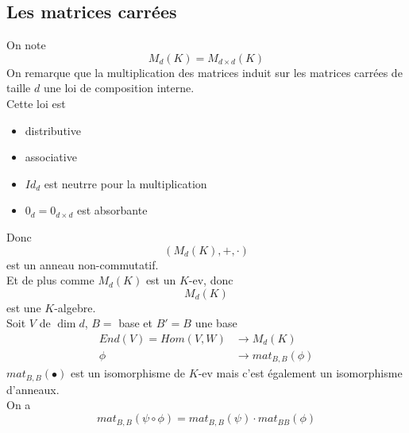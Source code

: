 \documentclass[../main.tex]{subfiles}
\begin{document}
\subsection{Les matrices carrées}
On note
\[ 
	M_{d} ( K) = M_{d\times d} ( K) 
\]
On remarque que la multiplication des matrices induit sur les matrices carrées de taille $d$ une loi de composition interne.\\
Cette loi est
\begin{itemize}
\item distributive
\item associative
\item $Id_d$ est neutrre pour la multiplication
\item $0_d= 0_{d\times d} $ est absorbante
\end{itemize}
Donc
\[ 
	( M_{d} ( K) ,+,\cdot) 
\]
est un anneau non-commutatif.\\
Et de plus comme $M_d( K) $ est un $K$-ev, donc
\[ 
	M_d( K) 
\]
est une $K$-algebre.\\
Soit $V$ de $\dim d$, $B=$ base et $B'=B$ une base
\begin{align*}
	End( V) = Hom( V,W) &\to M_d( K) \\
	\phi&\to mat_{B,B} ( \phi) 
\end{align*}
$mat_{B,B} ( \bullet) $ est un isomorphisme de $K$-ev mais c'est également un isomorphisme d'anneaux.\\
On a
\[ 
	mat_{B,B} ( \psi\circ\phi) = mat_{B,B} ( \psi) \cdot mat_{BB} ( \phi) 
\]






	
\end{document}
